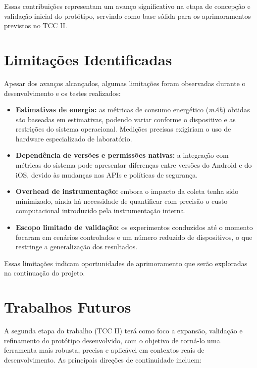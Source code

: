 \documentclass[12pt,a4paper,oneside]{abntex2}
\begin{document}
Essas contribuições representam um avanço significativo na etapa de concepção e validação inicial do protótipo, servindo como base sólida para os aprimoramentos previstos no TCC II.

\section{Limitações Identificadas}

Apesar dos avanços alcançados, algumas limitações foram observadas durante o desenvolvimento e os testes realizados:

\begin{itemize}
  \item \textbf{Estimativas de energia:} as métricas de consumo energético (\textit{mAh}) obtidas são baseadas em estimativas, podendo variar conforme o dispositivo e as restrições do sistema operacional. Medições precisas exigiriam o uso de hardware especializado de laboratório.
  
  \item \textbf{Dependência de versões e permissões nativas:} a integração com métricas do sistema pode apresentar diferenças entre versões do Android e do iOS, devido às mudanças nas APIs e políticas de segurança.
  
  \item \textbf{Overhead de instrumentação:} embora o impacto da coleta tenha sido minimizado, ainda há necessidade de quantificar com precisão o custo computacional introduzido pela instrumentação interna.
  
  \item \textbf{Escopo limitado de validação:} os experimentos conduzidos até o momento focaram em cenários controlados e um número reduzido de dispositivos, o que restringe a generalização dos resultados.
\end{itemize}

Essas limitações indicam oportunidades de aprimoramento que serão exploradas na continuação do projeto.

\section{Trabalhos Futuros}

A segunda etapa do trabalho (TCC II) terá como foco a expansão, validação e refinamento do protótipo desenvolvido, com o objetivo de torná-lo uma ferramenta mais robusta, precisa e aplicável em contextos reais de desenvolvimento.  
As principais direções de continuidade incluem:
\end{document}
